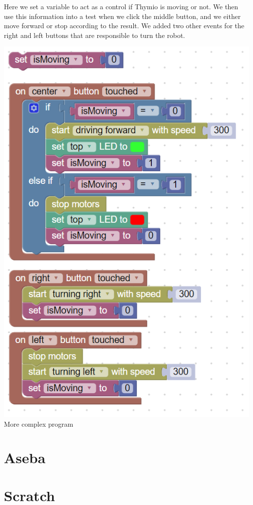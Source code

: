 \documentclass{scrbook}
\begin{document}
Here we set a variable to act as a control if Thymio is moving or not. We then use this information into a test when we click the middle button, and we either move forward or stop according to the result. 
We added two other events for the right and left buttons that are responsible to turn the robot.
\begin{center}
  \includegraphics[scale=0.5]{./Blockly/advanced_program}\\
  More complex program
\end{center}

\section{Aseba}
\section{Scratch}
\end{document}
